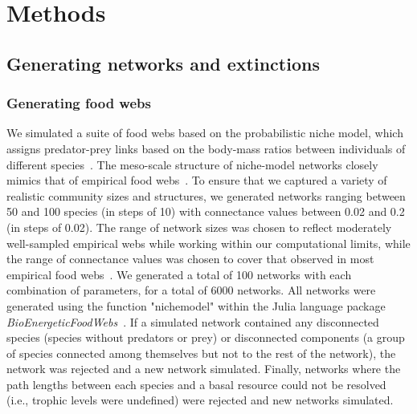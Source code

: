 \documentclass[12pt]{article}
\begin{document}
\section*{Methods}

    \subsection*{Generating networks and extinctions}

    	\subsubsection*{Generating food webs}
    
    		We simulated a suite of food webs based on the probabilistic niche model, which assigns predator-prey links based on the body-mass ratios between individuals of different species~\citep{Williams2000,Delmas2017}. The meso-scale structure of niche-model networks closely mimics that of empirical food webs~\citep{Stouffer2007}. To ensure that we captured a variety of realistic community sizes and structures, we generated networks ranging between 50 and 100 species (in steps of 10) with connectance values between 0.02 and 0.2 (in steps of 0.02). The range of network sizes was chosen to reflect moderately well-sampled empirical webs while working within our computational limits, while the range of connectance values was chosen to cover that observed in most empirical food webs~\citep{Dunne2002}. We generated a total of 100 networks with each combination of parameters, for a total of 6000 networks. All networks were generated using the function "nichemodel" within the Julia language package \emph{BioEnergeticFoodWebs}~\citep{bioenergeticfw,Delmas2017}. If a simulated network contained any disconnected species (species without predators or prey) or disconnected components (a group of species connected among themselves but not to the rest of the network), the network was rejected and a new network simulated. Finally, networks where the path lengths between each species and a basal resource could not be resolved (i.e., trophic levels were undefined) were rejected and new networks simulated.
    
\end{document}
